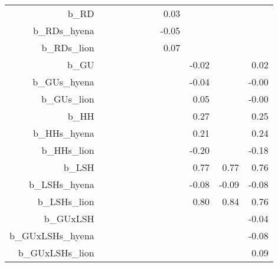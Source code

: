 \begin{table}[ht]
\begin{tabular}{rrrrrrrrrrr}
  b\_RD &  &  &  &  &  &  & 0.03 &  &  &  \\ 
  b\_RDs\_hyena &  &  &  &  &  &  & -0.05 &  &  &  \\ 
  b\_RDs\_lion &  &  &  &  &  &  & 0.07 &  &  &  \\ 
  b\_GU &  &  &  &  &  &  &  & -0.02 &  & 0.02 \\ 
  b\_GUs\_hyena &  &  &  &  &  &  &  & -0.04 &  & -0.00 \\ 
  b\_GUs\_lion &  &  &  &  &  &  &  & 0.05 &  & -0.00 \\ 
  b\_HH &  &  &  &  &  &  &  & 0.27 &  & 0.25 \\ 
  b\_HHs\_hyena &  &  &  &  &  &  &  & 0.21 &  & 0.24 \\ 
  b\_HHs\_lion &  &  &  &  &  &  &  & -0.20 &  & -0.18 \\ 
  b\_LSH &  &  &  &  &  &  &  & 0.77 & 0.77 & 0.76 \\ 
  b\_LSHs\_hyena &  &  &  &  &  &  &  & -0.08 & -0.09 & -0.08 \\ 
  b\_LSHs\_lion &  &  &  &  &  &  &  & 0.80 & 0.84 & 0.76 \\ 
  b\_GUxLSH &  &  &  &  &  &  &  &  &  & -0.04 \\ 
  b\_GUxLSHs\_hyena &  &  &  &  &  &  &  &  &  & -0.08 \\ 
  b\_GUxLSHs\_lion &  &  &  &  &  &  &  &  &  & 0.09 \\ 
   \hline
\end{tabular}
\end{table}
